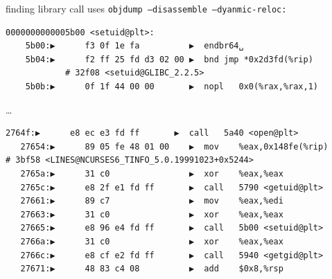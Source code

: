 \begin{frame}[fragile]{finding library call uses}
{\small {\tt objdump --disassemble --dyanmic-reloc:}}
\begin{Verbatim}[fontsize=\fontsize{9}{10}]
0000000000005b00 <setuid@plt>:
    5b00:▶      f3 0f 1e fa          ▶  endbr64␣
    5b04:▶      f2 ff 25 fd d3 02 00 ▶  bnd jmp *0x2d3fd(%rip) 
			# 32f08 <setuid@GLIBC_2.2.5>
    5b0b:▶      0f 1f 44 00 00       ▶  nopl   0x0(%rax,%rax,1)
\end{Verbatim}
\ldots
\begin{Verbatim}[fontsize=\fontsize{9}{10}]
   2764f:▶      e8 ec e3 fd ff       ▶  call   5a40 <open@plt>
   27654:▶      89 05 fe 48 01 00    ▶  mov    %eax,0x148fe(%rip)        # 3bf58 <LINES@NCURSES6_TINFO_5.0.19991023+0x5244>
   2765a:▶      31 c0                ▶  xor    %eax,%eax
   2765c:▶      e8 2f e1 fd ff       ▶  call   5790 <getuid@plt>
   27661:▶      89 c7                ▶  mov    %eax,%edi
   27663:▶      31 c0                ▶  xor    %eax,%eax
   27665:▶      e8 96 e4 fd ff       ▶  call   5b00 <setuid@plt>
   2766a:▶      31 c0                ▶  xor    %eax,%eax
   2766c:▶      e8 cf e2 fd ff       ▶  call   5940 <getgid@plt>
   27671:▶      48 83 c4 08          ▶  add    $0x8,%rsp
\end{Verbatim}
\end{frame}

